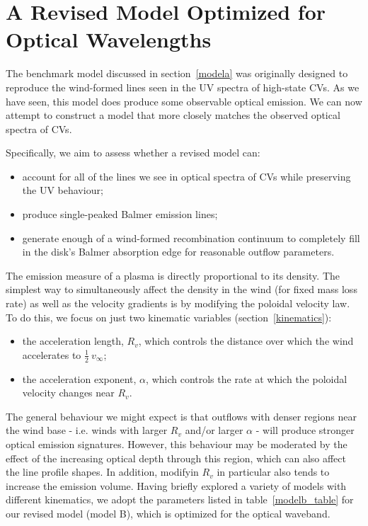 \documentclass[preprint, a4paper, 11pt]{aastex}
\begin{document}
%
%

\section{A Revised Model Optimized for Optical Wavelengths}

The benchmark model discussed in section~\ref{modela} was originally
designed to reproduce the wind-formed lines seen in the UV spectra of
high-state CVs. As we have seen, this model does produce some observable
optical emission. We can now attempt to construct a model that more closely 
matches the observed optical spectra of CVs. 

Specifically, we aim to assess whether a revised model can:

\begin{itemize}
         \item account for all of the lines we see in optical spectra of CVs while preserving
the UV behaviour;
         \item produce single-peaked Balmer emission lines; 
         \item generate enough of a wind-formed recombination continuum
to completely fill in the disk's Balmer absorption edge for 
reasonable outflow parameters.
\end{itemize} 

The emission measure of a plasma is directly proportional to its density.
The simplest way to simultaneously affect the density in the wind (for fixed mass loss rate)
as well as the velocity gradients is by modifying the poloidal velocity
law. To do this, we focus on just two kinematic variables (section~\ref{kinematics}):

\begin{itemize}
         \item the acceleration length, $R_v$, which controls the
        distance over which the wind accelerates to $\frac{1}{2}~v_{\infty}$;
         \item the acceleration exponent, $\alpha$, which controls the rate 
         at which the poloidal velocity changes near $R_v$.
\end{itemize} 

The general behaviour we might expect is that outflows with denser
regions near the wind base - i.e. winds with larger $R_{v}$ and/or
larger $\alpha$ - will produce stronger optical emission signatures. 
However, this behaviour may be moderated by the effect of the increasing
optical depth through this region, which can also affect the line profile shapes. 
In addition, modifyin $R_v$ in particular also tends to increase the emission volume.
Having briefly explored a variety of models with different kinematics,
we adopt the parameters listed in table~\ref{modelb_table}
for our revised model (model B), which is optimized for the optical waveband. 
\end{document}
